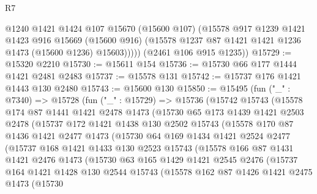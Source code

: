 \begin{lexlean}{R7}
\begin{coremodule}
            @1240
            @1421
            @1424
            @107
            @15670
            (@15600 @107)
            (@15578
              @917
              @1239
              @1421
              @1423
              @916
              @15669
              (@15600 @916)
              (@15578 @1237 @87 @1421 @1421 @1236 @1473 (@15600 @1236) @15603)))))
      (@2461 @106 @915 @1235))
@15729 := @15320 @2210
@15730 := @15611 @154
@15736 := @15730 @66 @177 @1444 @1421 @2481 @2483
@15737 := @15578 @131
@15742 := @15737 @176 @1421 @1443 @130 @2480
@15743 := @15600 @130
@15850 := @15495
    (fun ("_" : @7340) =>
    @15728
      (fun ("_" : @15729) =>
      @15736
        (@15742
          @15743
          (@15578
            @174
            @87
            @1441
            @1421
            @2478
            @1473
            (@15730
              @65
              @173
              @1439
              @1421
              @2503
              @2478
              (@15737
                @172
                @1421
                @1438
                @130
                @2502
                @15743
                (@15578
                  @170
                  @87
                  @1436
                  @1421
                  @2477
                  @1473
                  (@15730
                    @64
                    @169
                    @1434
                    @1421
                    @2524
                    @2477
                    (@15737
                      @168
                      @1421
                      @1433
                      @130
                      @2523
                      @15743
                      (@15578
                        @166
                        @87
                        @1431
                        @1421
                        @2476
                        @1473
                        (@15730
                          @63
                          @165
                          @1429
                          @1421
                          @2545
                          @2476
                          (@15737
                            @164
                            @1421
                            @1428
                            @130
                            @2544
                            @15743
                            (@15578
                              @162
                              @87
                              @1426
                              @1421
                              @2475
                              @1473
                              (@15730

\end{coremodule}
\end{lexlean}
